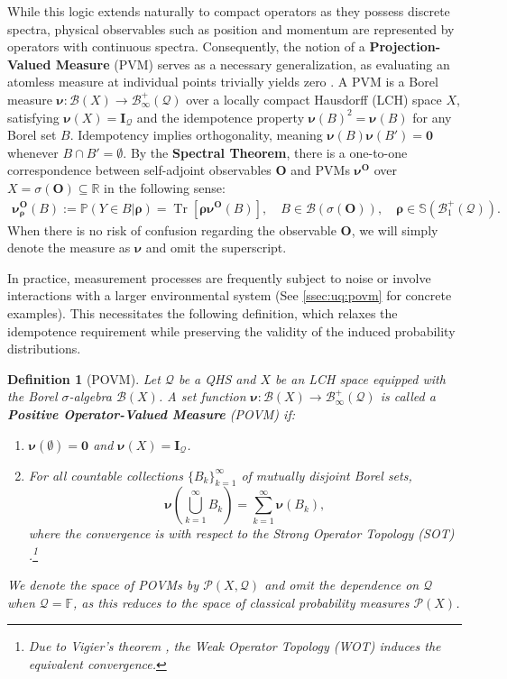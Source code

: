 \documentclass[noinfoline]{imsart}\setcounter{tocdepth}{2}
\renewcommand{\b}[1]{\mathbb{#1}} %
\newcommand{\m}[1]{\mathbf{#1}} %
\newcommand{\s}[1]{\mathscr{#1}} %
\renewcommand{\c}[1]{\mathcal{#1}} %
\newcommand{\mb}[1]{\boldsymbol{#1}} %
\newcommand{\tr}[1]{\operatorname{Tr}\left[#1\right]}
\theoremstyle{plain}
\newtheorem{definition}[theorem]{Definition}
\begin{document}
While this logic extends naturally to compact operators as they possess discrete spectra, physical observables such as position and momentum are represented by operators with continuous spectra. Consequently, the notion of a \textbf{Projection-Valued Measure} (PVM) serves as a necessary generalization, as evaluating an atomless measure at individual points trivially yields zero \cite{hall2013quantum}. A PVM is a Borel measure $\mb{\nu}: \s{B}(X) \to \c{B}_{\infty}^{+} (\c{Q})$ over a locally compact Hausdorff (LCH) space $X$, satisfying $\mb{\nu}(X) = \m{I}_{\c{Q}}$ and the idempotence property $\mb{\nu}(B)^{2} = \mb{\nu}(B)$ for any Borel set $B$. Idempotency implies orthogonality, meaning $\mb{\nu}(B) \mb{\nu}(B') = \m{0}$ whenever $B \cap B' = \emptyset$. By the \textbf{Spectral Theorem}, there is a one-to-one correspondence between self-adjoint observables $\m{O}$ and PVMs $\mb{\nu}^{\m{O}}$ over $X = \sigma(\m{O}) \subseteq \b{R}$ in the following sense:
\begin{align*}
    \mb{\nu}^{\m{O}}_{\mb{\rho}}(B) := \b{P}(Y \in B \vert \mb{\rho}) = \tr{\mb{\rho} \mb{\nu}^{\m{O}}(B)}, \quad B \in \s{B}(\sigma(\m{O})), \quad \mb{\rho} \in \b{S}(\c{B}_{1}^{+}(\c{Q})).
\end{align*}
When there is no risk of confusion regarding the observable $\m{O}$, we will simply denote the measure as $\mb{\nu}$ and omit the superscript.

In practice, measurement processes are frequently subject to noise or involve interactions with a larger environmental system (See \cref{ssec:uq:povm} for concrete examples). This necessitates the following definition, which relaxes the idempotence requirement while preserving the validity of the induced probability distributions.

\begin{definition}[POVM]\label{def:POVM}
Let $\c{Q}$ be a QHS and $X$ be an LCH space equipped with the Borel $\sigma$-algebra $\s{B}(X)$. A set function $\mb{\nu}: \s{B}(X) \to \c{B}_{\infty}^{+} (\c{Q})$ is called a \textbf{Positive Operator-Valued Measure} (POVM) if:
\begin{enumerate}
\item $\mb{\nu}(\emptyset) = \m{0}$ and $\mb{\nu}(X) = \m{I}_{\c{Q}}$.
\item For all countable collections $\{B_{k}\}_{k=1}^{\infty}$ of mutually disjoint Borel sets,
\begin{equation*}
    \mb{\nu} \left(\bigcup_{k=1}^{\infty} B_{k} \right) = \sum_{k=1}^{\infty} \mb{\nu} (B_{k}),
\end{equation*}
where the convergence is with respect to the Strong Operator Topology (SOT) \cite{conway2019functional}.\footnote{Due to Vigier's theorem \cite{conway2025course}, the Weak Operator Topology (WOT) induces the equivalent convergence.}
\end{enumerate}
We denote the space of POVMs by $\s{P}(X, \c{Q})$ and omit the dependence on $\c{Q}$ when $\c{Q} = \b{F}$, as this reduces to the space of classical probability measures $\s{P}(X)$. 
\end{definition}
\end{document}
